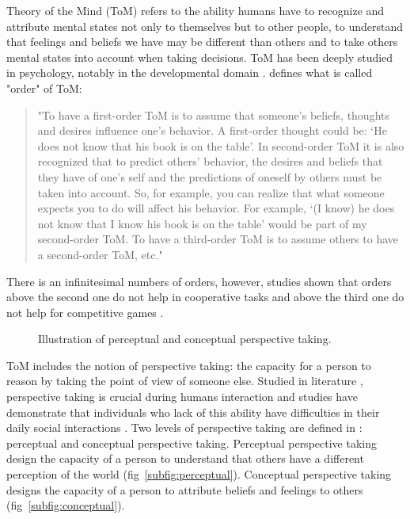 \documentclass[english,a4paper,11pt,twoside]{StyleThese}
\begin{document}
Theory of the Mind (ToM) refers to the ability humans have to recognize and attribute mental states not only to themselves but to other people, to understand that feelings and beliefs we have may be different than others and to take others mental states into account when taking decisions. ToM has been deeply studied in psychology, notably in the developmental domain \cite{baron1985does, premack1978does}. \cite{verbrugge2008learning} defines what is called "order" of ToM:
\begin{quote}
"To have a first-order ToM is to assume that someone’s beliefs,
thoughts and desires influence one’s behavior. A first-order thought could be: ‘He does not know that his book is on the table’. In second-order ToM it is also recognized that to predict others’ behavior, the desires and beliefs that they have of one’s self and the predictions of oneself by others must be taken into account. So, for example, you can realize that what someone expects you to do will affect his behavior. For example, ‘(I know) he does not know that I know his book is on the table’ would be part of my second-order ToM. To have a third-order ToM is to assume others to have a second-order ToM, etc."
\end{quote}
There is an infinitesimal numbers of orders, however, studies shown that orders above the second one do not help in cooperative tasks \cite{de2014theory} and above the third one do not help for competitive games \cite{de2014theory}.


\begin{figure}[!h]
    \centering
    \caption{Illustration of perceptual and conceptual perspective taking.}
\end{figure}

ToM includes the notion of perspective taking: the capacity for a person to reason by taking the point of view of someone else. Studied in literature \cite{tversky1999speakers, flavell1992perspectives}, perspective taking is crucial during humans interaction and studies have demonstrate that individuals who lack of this ability have difficulties in their daily social interactions \cite{frick2014picturing}. Two levels of perspective taking are defined in \cite{flavell1977development}: perceptual and conceptual perspective taking. Perceptual perspective taking design the capacity of a person to understand that others have a different perception of the world (fig~\ref{subfig:perceptual}). Conceptual perspective taking designs the capacity of a person to attribute beliefs and feelings to others (fig~\ref{subfig:conceptual}).
\end{document}
